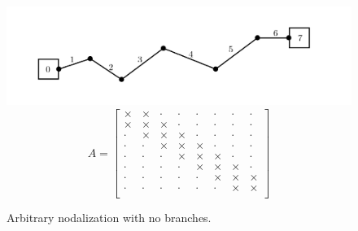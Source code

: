 \documentclass[11pt,letterpaper,titlepage]{article}
\begin{document}
\begin{figure}[H]
\centering
\includegraphics[width=0.7\linewidth]{Latexdraw/SingleThrough}
\begin{equation*}
A=
\begin{bmatrix}
\times & \times & \cdot & \cdot & \cdot & \cdot & \cdot & \cdot \\
\times & \times & \times & \cdot & \cdot & \cdot & \cdot & \cdot \\
\cdot & \times & \times & \times & \cdot & \cdot & \cdot & \cdot \\
\cdot & \cdot & \times & \times & \times & \cdot & \cdot & \cdot \\
\cdot & \cdot & \cdot & \times & \times & \times & \cdot & \cdot \\
\cdot & \cdot & \cdot & \cdot & \times & \times & \times & \cdot \\
\cdot & \cdot & \cdot & \cdot & \cdot & \times & \times & \times \\
\cdot & \cdot & \cdot & \cdot & \cdot & \cdot & \times & \times \\
\end{bmatrix}
\end{equation*} 
\caption[CrazyNodes]{Arbitrary nodalization with no branches.}
\label{fig:SingleThrough}
\end{figure}  
\end{document}
